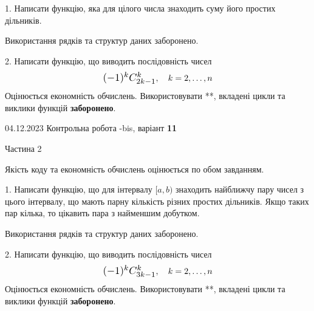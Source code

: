 \documentclass[12pt, ukrainian]{article}
\begin{document}
{{{{{{{{{{\begin {Large}
1. Написати функцію, яка для цілого числа знаходить суму його простих дільників.

 Використання рядків та структур даних заборонено. 



\vspace{10mm}



2. 
Написати функцію, що виводить послідовність чисел
$$\scalebox{1.2}{$(-1)^{k}C_{2k-1}^{k}$}, \quad k=2,\ldots,n$$
Оцінюється економність обчислень. Використовувати **, вкладені цикли та виклики функцій \textbf{заборонено}.

\end{Large}\newpage




\begin {Huge}
{{04.12.2023 Контрольна робота -bis, варіант  \No \textbf { 11 }\par}}

\begin{center}Частина 2
\end{center}
\vspace{10mm}
\end {Huge}

{
\begin {Large}
Якість коду та економність обчислень оцінюється по обом завданням. 

\vspace{5mm}

1. Написати функцію, що для інтервалу $[a, b)$ знаходить найближчу пару чисел з цього інтервалу, що мають парну кількість різних простих дільників. Якщо таких пар кілька, то цікавить пара з найменшим добутком.

 Використання рядків та структур даних заборонено. 



\vspace{10mm}



2. 
Написати функцію, що виводить послідовність чисел
$$\scalebox{1.2}{$(-1)^{k}C_{3k-1}^{k}$}, \quad k=2,\ldots,n$$
Оцінюється економність обчислень. Використовувати **, вкладені цикли та виклики функцій \textbf{заборонено}.

\end{Large}\newpage




}}}}}}}}}}}
\end{document}
